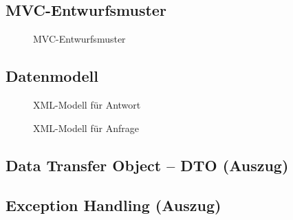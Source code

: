 \subsection{MVC-Entwurfsmuster}
\label{app:MVC}
\begin{figure}[!h]
    \centering
    \caption{MVC-Entwurfsmuster}
\end{figure}
\clearpage

\thispagestyle{empty}

\clearpage

\setcounter{subsection}{9}

\clearpage

\thispagestyle{empty}


\setcounter{subsection}{11}
\subsection{Datenmodell}
\label{app:Datenmodell}
\begin{figure}[h]
    \centering
    \caption{XML-Modell für Antwort}        
\end{figure}
\begin{figure}[!htb]
    \centering
    \caption{XML-Modell für Anfrage}
\end{figure}
\clearpage

\subsection{Data Transfer Object -- DTO (Auszug)}
\label{app:DTO}

\clearpage

\subsection{Exception Handling (Auszug)}
\label{app:ExceptionHandling}

\clearpage

